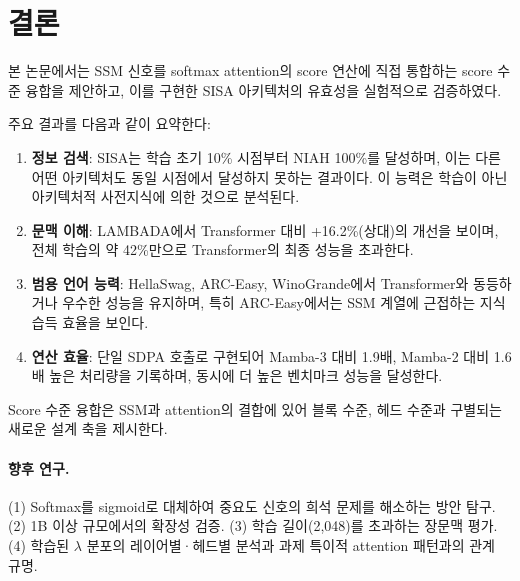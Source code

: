 \documentclass[11pt]{article}
\begin{document}
\section{결론}

본 논문에서는 SSM 신호를 softmax attention의 score 연산에 직접 통합하는 score 수준 융합을 제안하고, 이를 구현한 SISA 아키텍처의 유효성을 실험적으로 검증하였다.

주요 결과를 다음과 같이 요약한다:

\begin{enumerate}[leftmargin=*]
\item \textbf{정보 검색}: SISA는 학습 초기 10\% 시점부터 NIAH 100\%를 달성하며, 이는 다른 어떤 아키텍처도 동일 시점에서 달성하지 못하는 결과이다. 이 능력은 학습이 아닌 아키텍처적 사전지식에 의한 것으로 분석된다.

\item \textbf{문맥 이해}: LAMBADA에서 Transformer 대비 +16.2\%(상대)의 개선을 보이며, 전체 학습의 약 42\%만으로 Transformer의 최종 성능을 초과한다.

\item \textbf{범용 언어 능력}: HellaSwag, ARC-Easy, WinoGrande에서 Transformer와 동등하거나 우수한 성능을 유지하며, 특히 ARC-Easy에서는 SSM 계열에 근접하는 지식 습득 효율을 보인다.

\item \textbf{연산 효율}: 단일 SDPA 호출로 구현되어 Mamba-3 대비 1.9배, Mamba-2 대비 1.6배 높은 처리량을 기록하며, 동시에 더 높은 벤치마크 성능을 달성한다.
\end{enumerate}

Score 수준 융합은 SSM과 attention의 결합에 있어 블록 수준, 헤드 수준과 구별되는 새로운 설계 축을 제시한다.

\paragraph{향후 연구.}
(1) Softmax를 sigmoid로 대체하여 중요도 신호의 희석 문제를 해소하는 방안 탐구.
(2) 1B 이상 규모에서의 확장성 검증.
(3) 학습 길이(2,048)를 초과하는 장문맥 평가.
(4) 학습된 $\lambda$ 분포의 레이어별·헤드별 분석과 과제 특이적 attention 패턴과의 관계 규명.
\end{document}
